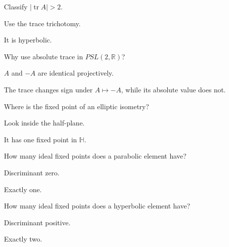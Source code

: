 \begin{exercise}\label{exr:vii34-05}
Classify \(|\operatorname{tr}A|>2\).
\end{exercise}
\begin{hint}
Use the trace trichotomy.
\end{hint}
\begin{solution}
It is hyperbolic.
\end{solution}

\begin{exercise}\label{exr:vii34-06}
Why use absolute trace in \(PSL(2,\mathbb R)\)?
\end{exercise}
\begin{hint}
\(A\) and \(-A\) are identical projectively.
\end{hint}
\begin{solution}
The trace changes sign under \(A\mapsto-A\), while its absolute value does not.
\end{solution}

\begin{exercise}\label{exr:vii34-07}
Where is the fixed point of an elliptic isometry?
\end{exercise}
\begin{hint}
Look inside the half-plane.
\end{hint}
\begin{solution}
It has one fixed point in \(\mathbb H\).
\end{solution}

\begin{exercise}\label{exr:vii34-08}
How many ideal fixed points does a parabolic element have?
\end{exercise}
\begin{hint}
Discriminant zero.
\end{hint}
\begin{solution}
Exactly one.
\end{solution}

\begin{exercise}\label{exr:vii34-09}
How many ideal fixed points does a hyperbolic element have?
\end{exercise}
\begin{hint}
Discriminant positive.
\end{hint}
\begin{solution}
Exactly two.
\end{solution}

